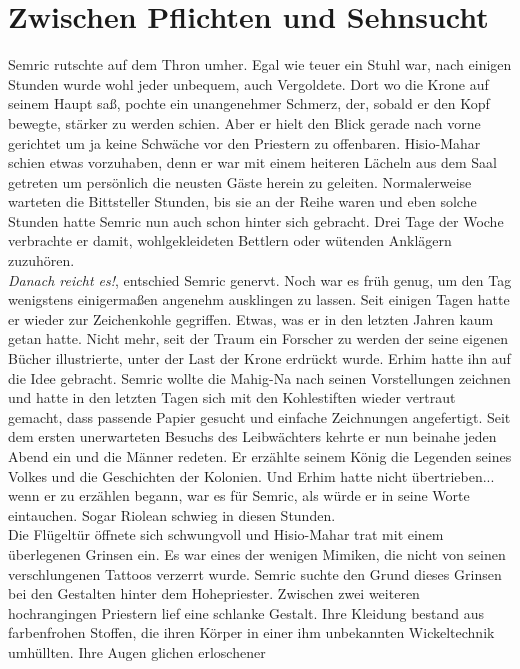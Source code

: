 \chapter{Zwischen Pflichten und Sehnsucht}

Semric rutschte auf dem Thron umher. Egal wie teuer ein Stuhl war, nach einigen Stunden wurde wohl 
jeder unbequem, auch Vergoldete. Dort wo die Krone auf seinem Haupt saß, pochte ein unangenehmer 
Schmerz, der, sobald er den Kopf bewegte, stärker zu werden schien. Aber er hielt den Blick gerade 
nach vorne gerichtet um ja keine Schwäche vor den Priestern zu offenbaren. Hisio-Mahar schien etwas 
vorzuhaben, denn er war mit einem heiteren Lächeln aus dem Saal getreten um persönlich die neusten 
Gäste herein zu geleiten. Normalerweise warteten die Bittsteller Stunden, bis sie an der Reihe 
waren und eben solche Stunden hatte Semric nun auch schon hinter sich gebracht. Drei Tage der Woche 
verbrachte er damit, wohlgekleideten Bettlern oder wütenden Anklägern zuzuhören.\\
\textit{Danach reicht es!}, entschied Semric genervt. Noch war es früh genug, um den Tag wenigstens 
einigermaßen angenehm ausklingen zu lassen. Seit einigen Tagen hatte er wieder zur Zeichenkohle 
gegriffen. Etwas, was er in den letzten Jahren kaum getan hatte. Nicht mehr, seit der Traum ein 
Forscher zu werden der seine eigenen Bücher illustrierte, unter der Last der Krone erdrückt wurde. 
Erhim hatte ihn auf die Idee gebracht. Semric wollte die Mahig-Na nach seinen Vorstellungen 
zeichnen und hatte in den letzten Tagen sich mit den Kohlestiften wieder vertraut gemacht, dass 
passende Papier gesucht und einfache Zeichnungen angefertigt. Seit dem ersten unerwarteten Besuchs 
des Leibwächters kehrte er nun beinahe jeden Abend ein und die Männer redeten. Er erzählte seinem 
König die Legenden seines Volkes und die Geschichten der Kolonien. Und Erhim hatte nicht 
übertrieben... wenn er zu erzählen begann, war es für Semric, als würde er in seine Worte 
eintauchen. Sogar Riolean schwieg in diesen Stunden.\\
Die Flügeltür öffnete sich schwungvoll und Hisio-Mahar trat mit einem überlegenen Grinsen ein. Es 
war eines der wenigen Mimiken, die nicht von seinen verschlungenen Tattoos verzerrt wurde. Semric 
suchte den Grund dieses Grinsen bei den Gestalten hinter dem Hohepriester. Zwischen zwei weiteren 
hochrangingen Priestern lief eine schlanke Gestalt. Ihre Kleidung bestand aus farbenfrohen Stoffen, 
die ihren Körper in einer ihm unbekannten Wickeltechnik umhüllten. Ihre Augen glichen erloschener 
